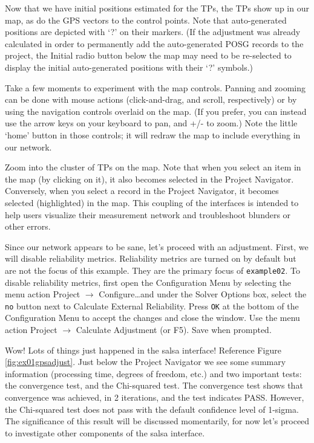 Now that we have initial positions estimated for the TPs, the TPs show up in our map, as do the GPS vectors to the control points.  Note that auto-generated positions are depicted with `?' on their markers. (If the adjustment was already calculated in order to permanently add the auto-generated POSG records to the project, the Initial radio button below the map may need to be re-selected to display the initial auto-generated positions with their `?' symbols.)

Take a few moments to experiment with the map controls.  Panning and zooming can be done with mouse actions (click-and-drag, and scroll, respectively) or by using the navigation controls overlaid on the map.  (If you prefer, you can instead use the arrow keys on your keyboard to pan, and +/- to zoom.)  Note the little `home' button in those controls; it will redraw the map to include everything in our network.

Zoom into the cluster of TPs on the map.  Note that when you select an item in the map (by clicking on it), it also becomes selected in the Project Navigator.  Conversely, when you select a record in the Project Navigator, it becomes selected (highlighted) in the map.  This coupling of the interfaces is intended to help users visualize their measurement network and troubleshoot blunders or other errors.

Since our network appears to be sane, let's proceed with an adjustment.  First, we will disable reliability metrics. Reliability metrics are turned on by default but are not the focus of this example. They are the primary focus of \verb+example02+. To disable reliability metrics, first open the Configuration Menu by selecting the menu action Project $\to$ Configure\ldots and under the Solver Options box, select the \verb+no+ button next to Calculate External Reliability. Press \verb+OK+ at the bottom of the Configuration Menu to accept the changes and close the window. Use the menu action Project $\to$ Calculate Adjustment (or F5).  Save when prompted.

Wow!  Lots of things just happened in the \textsf{salsa} interface!  Reference Figure \ref{fig:ex01gpsadjust}.  Just below the Project Navigator we see some summary information (processing time, degrees of freedom, etc.) and two important tests: the convergence test, and the Chi-squared test.  The convergence test shows that convergence was achieved, in 2 iterations, and the test indicates PASS.  However, the Chi-squared test does not pass with the default confidence level of 1-sigma. The significance of this result will be discussed momentarily, for now let's proceed to investigate other components of the \textsf{salsa} interface.

